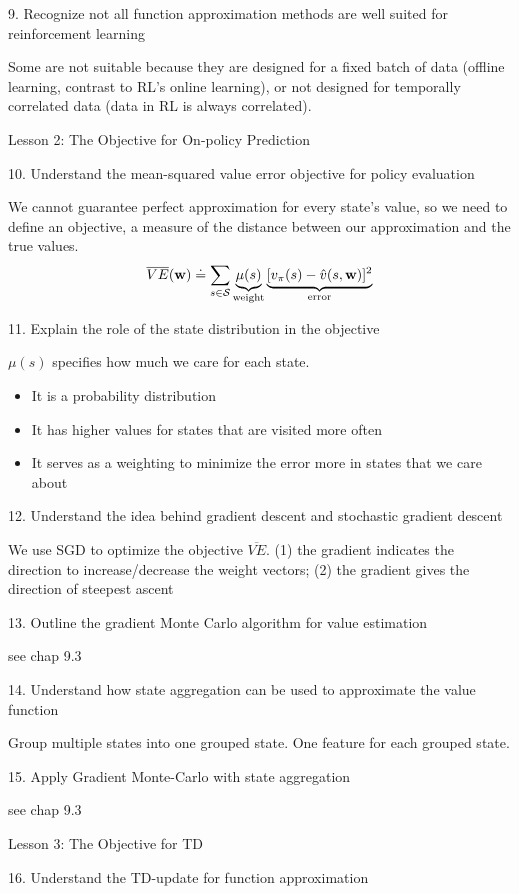 \documentclass[sutton_barto_notes.tex]{subfiles}
\begin{document}
9. Recognize not all function approximation methods are well suited for reinforcement learning 

Some are not suitable because they are designed for a fixed batch of data (offline learning, contrast to RL's online learning), or not designed for temporally correlated data (data in RL is always correlated).

Lesson 2: The Objective for On-policy Prediction 

10. Understand the mean-squared value error objective for policy evaluation 

We cannot guarantee perfect approximation for every state's value, so we need to define an objective, a measure of the distance between our approximation and the true values.
$$\overline{VE}({\operatorname*{\mathbf{w}}}) \doteq \sum_{s\in\operatorname*{\mathcal{S}}} \underbrace{\mu(s)}_{\text{weight}} \underbrace{[v_\pi(s) - \hat{v}(s,{\operatorname*{\mathbf{w}}})]^2}_{\text{error}}$$

11. Explain the role of the state distribution in the objective 

$\mu(s)$ specifies how much we care for each state.
\begin{itemize}
\item It is a probability distribution
\item It has higher values for states that are visited more often
\item It serves as a weighting to minimize the error more in states that we care about
\end{itemize}

12. Understand the idea behind gradient descent and stochastic gradient descent 

We use SGD to optimize the objective $\overline{VE}$. (1) the gradient indicates the direction to increase/decrease the weight vectors; (2) the gradient gives the direction of steepest ascent

13. Outline the gradient Monte Carlo algorithm for value estimation 

see chap 9.3

14. Understand how state aggregation can be used to approximate the value function 

Group multiple states into one grouped state. One feature for each grouped state.

15. Apply Gradient Monte-Carlo with state aggregation 

see chap 9.3

Lesson 3: The Objective for TD 

16. Understand the TD-update for function approximation 
\end{document}
